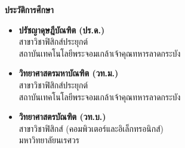 \begin{tcolorbox}[
    enhanced,
    colback=white,
    colframe=rbruNavy!85!black,
    arc=3mm,
    boxrule=1pt,
    top=8pt, bottom=8pt, left=10pt, right=10pt,
    drop shadow=black!8
]
    \begin{minipage}[t]{0.48\textwidth}
        {\large\bfseries\color{rbruGreen} ประวัติการศึกษา}
        \vspace{3pt}
        \begin{itemize}[leftmargin=1.1em, itemsep=1.5pt, topsep=1pt]
            \item \textbf{ปรัชญาดุษฎีบัณฑิต (ปร.ด.)}\\
            สาขาวิชาฟิสิกส์ประยุกต์\\
            สถาบันเทคโนโลยีพระจอมเกล้าเจ้าคุณทหารลาดกระบัง
            \item \textbf{วิทยาศาสตรมหาบัณฑิต (วท.ม.)}\\
            สาขาวิชาฟิสิกส์ประยุกต์\\
            สถาบันเทคโนโลยีพระจอมเกล้าเจ้าคุณทหารลาดกระบัง
            \item \textbf{วิทยาศาสตรบัณฑิต (วท.บ.)}\\
            สาขาวิชาฟิสิกส์ (คอมพิวเตอร์และอิเล็กทรอนิกส์)\\
            มหาวิทยาลัยนเรศวร
        \end{itemize}


\end{minipage}
\end{tcolorbox}
